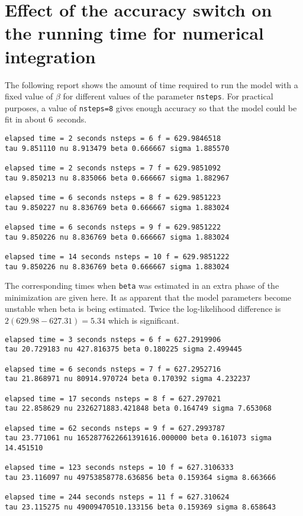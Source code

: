 \documentclass{admbmanual}
\begin{document}
\section{Effect of the accuracy switch on the\br
  running time for numerical integration}

The following report shows the amount of time required to run the model with a
fixed value of $\beta$ for different values of the parameter \texttt{nsteps}.
For practical purposes, a value of \texttt{nsteps=8} gives enough accuracy so
that the model could be fit in about 6~seconds.
\begin{lstlisting}
elapsed time = 2 seconds nsteps = 6 f = 629.9846518
tau 9.851110 nu 8.913479 beta 0.666667 sigma 1.885570

elapsed time = 2 seconds nsteps = 7 f = 629.9851092
tau 9.850213 nu 8.835066 beta 0.666667 sigma 1.882967

elapsed time = 6 seconds nsteps = 8 f = 629.9851223
tau 9.850227 nu 8.836769 beta 0.666667 sigma 1.883024

elapsed time = 6 seconds nsteps = 9 f = 629.9851222
tau 9.850226 nu 8.836769 beta 0.666667 sigma 1.883024

elapsed time = 14 seconds nsteps = 10 f = 629.9851222
tau 9.850226 nu 8.836769 beta 0.666667 sigma 1.883024
\end{lstlisting}

The corresponding times when \texttt{beta} was estimated in an extra phase of
the minimization are given here. It as apparent that the model parameters become
unstable when beta is being estimated. Twice the log-likelihood difference is
$2(629.98-627.31)=5.34$ which is significant.
\begin{lstlisting}
elapsed time = 3 seconds nsteps = 6 f = 627.2919906
tau 20.729183 nu 427.816375 beta 0.180225 sigma 2.499445

elapsed time = 6 seconds nsteps = 7 f = 627.2952716
tau 21.868971 nu 80914.970724 beta 0.170392 sigma 4.232237

elapsed time = 17 seconds nsteps = 8 f = 627.297021
tau 22.858629 nu 2326271883.421848 beta 0.164749 sigma 7.653068

elapsed time = 62 seconds nsteps = 9 f = 627.2993787
tau 23.771061 nu 1652877622661391616.000000 beta 0.161073 sigma 14.451510

elapsed time = 123 seconds nsteps = 10 f = 627.3106333
tau 23.116097 nu 49753858778.636856 beta 0.159364 sigma 8.663666

elapsed time = 244 seconds nsteps = 11 f = 627.310624
tau 23.115275 nu 49009470510.133156 beta 0.159369 sigma 8.658643
\end{lstlisting}
\end{document}
